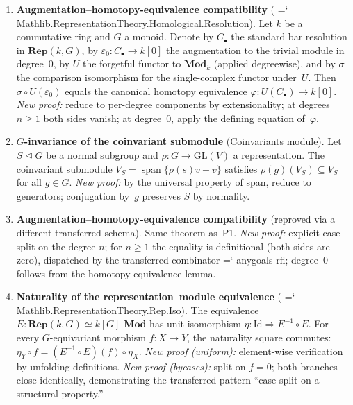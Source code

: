 \documentclass[11pt]{article}
\renewcommand{\texttt}[1]{%
  \begingroup\ttfamily\hyphenchar\font=`\-\relax
  \def\_{\textunderscore\discretionary{}{}{}}%
  #1\endgroup}
\theoremstyle{definition}
\theoremstyle{remark}
\begin{document}
\begin{enumerate}
\item[\textbf{P1.}] \textbf{Augmentation--homotopy-equivalence compatibility}
  (\texttt{Mathlib.Representation\-Theory.Homological.Resolution}).
  Let $k$ be a commutative ring and $G$ a monoid.  Denote by
  $C_\bullet$ the standard bar resolution in $\mathbf{Rep}(k,G)$,
  by $\varepsilon_0 : C_\bullet \to k[0]$ the augmentation to the
  trivial module in degree~$0$, by $U$ the forgetful functor to
  $\mathbf{Mod}_k$ (applied degreewise), and by $\sigma$ the
  comparison isomorphism for the single-complex functor under~$U$.
  Then $\sigma \circ U(\varepsilon_0)$ equals the canonical homotopy
  equivalence $\varphi : U(C_\bullet) \to k[0]$.
  \emph{New proof:}
  reduce to per-degree components by extensionality; at degrees
  $n \ge 1$ both sides vanish; at degree~$0$, apply the defining
  equation of~$\varphi$.

\item[\textbf{P2.}] \textbf{$G$-invariance of the coinvariant
  submodule}
  (Coinvariants module).
  Let $S \trianglelefteq G$ be a normal subgroup and
  $\rho : G \to \mathrm{GL}(V)$ a representation.
  The coinvariant submodule
  $V_S = \operatorname{span}\{\rho(s)v - v\}$ satisfies
  $\rho(g)(V_S) \subseteq V_S$ for all $g \in G$.
  \emph{New proof:}
  by the universal property of span, reduce to generators;
  conjugation by~$g$ preserves $S$ by normality.

\item[\textbf{P3.}] \textbf{Augmentation--homotopy-equivalence compatibility}
  (reproved via a different transferred schema).
  Same theorem as~P1.  \emph{New proof:}  explicit case split on the
  degree $n$; for $n \ge 1$ the equality is definitional (both sides
  are zero), dispatched by the transferred combinator
  \texttt{any\_goals rfl}; degree~$0$ follows from the
  homotopy-equivalence lemma.

\item[\textbf{P4.}] \textbf{Naturality of the representation--module equivalence}
  (\texttt{Mathlib.Representation\-Theory.Rep.Iso}).
  The equivalence $E : \mathbf{Rep}(k,G) \simeq k[G]\text{-}\mathbf{Mod}$
  has unit isomorphism $\eta : \mathrm{Id} \Rightarrow E^{-1} \circ E$.
  For every $G$-equivariant morphism $f : X \to Y$, the naturality
  square commutes:
  $\eta_Y \circ f = (E^{-1} \circ E)(f) \circ \eta_X$.
  \emph{New proof (uniform):} element-wise verification by unfolding
  definitions.
  \emph{New proof (by\_cases):} split on $f = 0$; both branches close
  identically, demonstrating the transferred pattern ``case-split on a
  structural property.''
\end{enumerate}
\end{document}
